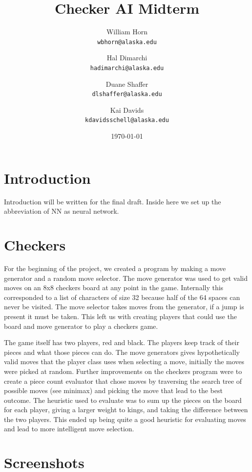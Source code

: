 \documentclass{article}
\begin{document}
\title{Checker AI Midterm}
\author{
  William Horn\\
  \texttt{wbhorn@alaska.edu}
  \and
  Hal Dimarchi\\
  \texttt{hadimarchi@alaska.edu}
  \and
  Duane Shaffer\\
  \texttt{dlshaffer@alaska.edu}
  \and
  Kai Davids\\
  \texttt{kdavidsschell@alaska.edu}
}
\date{\today}
\maketitle

\section{Introduction}

Introduction will be written for the final draft. Inside here we set up the
abbreviation of NN as neural network.

\section{Checkers}

For the beginning of the project, we created a program by making a
move generator and a random move selector. The move generator was used to get
valid moves on an 8x8 checkers board at any point in the game. Internally this
corresponded to a list of characters of size 32 because half of the 64 spaces
can never be visited. The move selector takes moves from the generator, if a
jump is present it must be taken. This left us with creating players that could
use the board and move generator to play a checkers game.

The game itself has two players, red and black. The players keep track of their pieces and what
those pieces can do. The move generators gives hypothetically valid moves that
the player class uses when selecting a move, initially the moves were picked at
random. Further improvements on the checkers program were to create a piece
count evaluator that chose moves by traversing the search tree of possible
moves (see minimax) and picking the move that lead to the best outcome. The
heuristic used to evaluate was to sum up the pieces on the board for each
player, giving a larger weight to kings, and taking the difference between the
two players. This ended up being quite a good heuristic for evaluating moves
and lead to more intelligent move selection.

\section{Screenshots}
\end{document}
